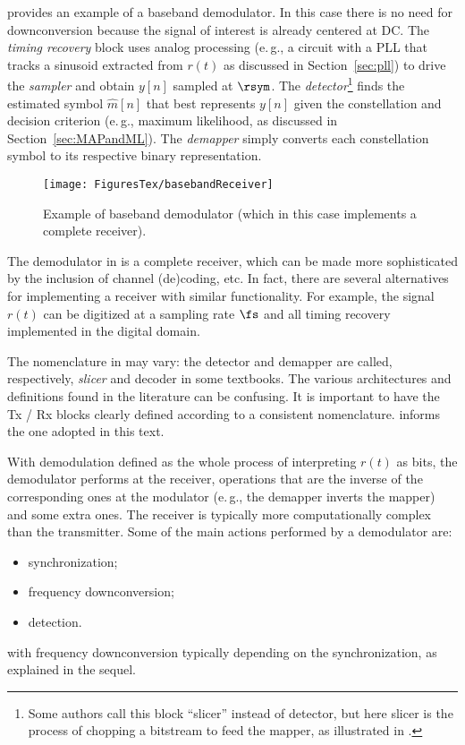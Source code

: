  provides an example of a baseband demodulator. In this case there is
no need for downconversion because the signal of interest is already centered at DC. The \emph{timing recovery} block uses analog processing (e.\,g., a circuit with a PLL that tracks a sinusoid extracted from $r(t)$ as discussed in Section~\ref{sec:pll}) to drive the \emph{sampler} and obtain $y[n]$ sampled at $\rsym$. 
The \emph{detector}\footnote{Some authors call this block ``slicer'' instead of
detector, but here slicer is the process of chopping a bitstream to feed the mapper, as illustrated in .} finds the estimated symbol $\hat m[n]$ that best represents
$y[n]$ given the constellation and decision criterion (e.\,g., maximum likelihood, as discussed in Section~\ref{sec:MAPandML}). The \emph{demapper} simply converts each constellation symbol to
its respective binary representation.

\begin{figure}[htbp]
\centering
\texttt{[image: FiguresTex/basebandReceiver]}
\caption{Example of baseband demodulator (which in this case implements a complete receiver).\label{fig:basebandReceiver}}
\end{figure}

The demodulator in  is a complete receiver, which can be made more
sophisticated by the inclusion of channel (de)coding, etc. In fact, there are several 
alternatives for implementing a receiver with similar functionality. For example, the
signal $r(t)$ can be digitized at a sampling rate $\fs$ and all timing recovery implemented
in the digital domain. 

The nomenclature in  may vary: the
detector and demapper are called, respectively, \emph{slicer} and decoder in some textbooks.
The various architectures and definitions found in the literature can be confusing. It is important to have the Tx / Rx blocks clearly defined according to a consistent nomenclature. 
 informs the one adopted in this text.

With demodulation defined as the whole process of interpreting $r(t)$ as bits, the demodulator performs at the receiver, operations that are the inverse of the corresponding ones at the modulator (e.\,g., the demapper inverts the mapper) and some extra ones. The receiver is typically more computationally complex than the transmitter. Some of the main actions performed by a demodulator are:
\begin{itemize}
	\item synchronization;
	\item frequency downconversion;	
	\item detection.
\end{itemize}
with frequency downconversion typically depending on the synchronization, as explained in the sequel.

